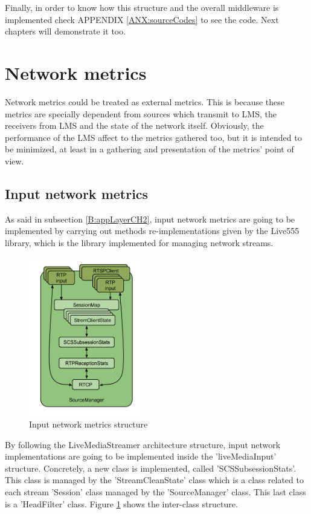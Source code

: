Finally, in order to know how this structure and the overall middleware is implemented check APPENDIX \ref{ANX:sourceCodes} to see the code. Next chapters will demonstrate it too.

\section{Network metrics}

Network metrics could be treated as external metrics. This is because these metrics are specially dependent from sources which transmit to LMS, the receivers from LMS and the state of the network itself. Obviously, the performance of the LMS affect to the metrics gathered too, but it is intended to be minimized, at least in a gathering and presentation of the metrics' point of view.

\subsection{Input network metrics}

As said in subsection \ref{B:appLayerCH2}, input network metrics are going to be implemented by carrying out methods re-implementations given by the Live555 library, which is the library implemented for managing network streams.  

\begin{figure}[!htb]
\begin{center}
\includegraphics[width=0.45\textwidth]{./images/SourceManager.png}
\caption{Input network metrics structure}
\label{F:inms}
\end{center}
\end{figure}

By following the LiveMediaStreamer architecture structure, input network implementations are going to be implemented inside the 'liveMediaInput' structure. Concretely, a new class is implemented, called 'SCSSubsessionStats'. This class is managed by the 'StreamCleanState' class which is a class related to each stream 'Session' class managed by the 'SourceManager' class. This last class is a 'HeadFilter' class. Figure \ref{F:inms} shows the inter-class structure.

